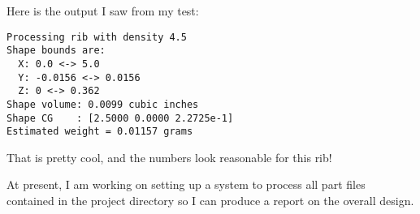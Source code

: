 Here is the output I saw from my test:

\begin{lstlisting}
Processing rib with density 4.5
Shape bounds are:
  X: 0.0 <-> 5.0
  Y: -0.0156 <-> 0.0156
  Z: 0 <-> 0.362
Shape volume: 0.0099 cubic inches
Shape CG    : [2.5000 0.0000 2.2725e-1]
Estimated weight = 0.01157 grams
\end{lstlisting}

That is pretty cool, and the numbers look reasonable for this rib!

At present, I am working on setting up a system to process all part files
contained in the project directory so I can produce a report on the overall
design.
